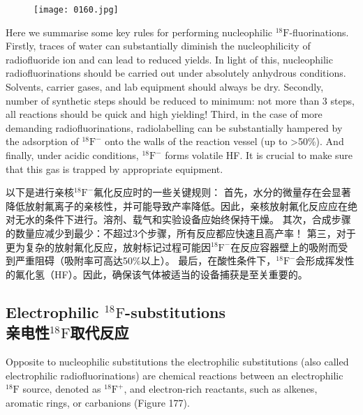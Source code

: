 \documentclass[dvipsnames, svgnames,a4paper,11pt]{article}
\begin{document}
\begin{figure}[h]
	\centering
    \texttt{[image: 0160.jpg]}    
     \label{fig176}
\end{figure}

Here we summarise some key rules for performing nucleophilic ${}^\mathrm{18}\mathrm{F}$-fluorinations.
Firstly, traces of water can substantially diminish the nucleophilicity of radiofluoride
ion and can lead to reduced yields. In light of this, nucleophilic radiofluorinations
should be carried out under absolutely anhydrous conditions. Solvents, carrier gases,
and lab equipment should always be dry. Secondly, number of synthetic steps
should be reduced to minimum: not more than 3 steps, all reactions should be quick
and high yielding! Third, in the case of more demanding radiofluorinations,
radiolabelling can be substantially hampered by the adsorption of ${}^\mathrm{18}\mathrm{F}^−$ onto the walls
of the reaction vessel (up to >50\%). And finally, under acidic conditions, ${}^\mathrm{18}\mathrm{F}^−$ forms
volatile HF. It is crucial to make sure that this gas is trapped by appropriate
equipment.

以下是进行亲核${}^\mathrm{18}\mathrm{F}^−$氟化反应时的一些关键规则： 首先，水分的微量存在会显著降低放射氟离子的亲核性，并可能导致产率降低。因此，亲核放射氟化反应应在绝对无水的条件下进行。溶剂、载气和实验设备应始终保持干燥。 其次，合成步骤的数量应减少到最少：不超过3个步骤，所有反应都应快速且高产率！ 第三，对于更为复杂的放射氟化反应，放射标记过程可能因${}^\mathrm{18}\mathrm{F}^−$在反应容器壁上的吸附而受到严重阻碍（吸附率可高达50\%以上）。 最后，在酸性条件下，${}^\mathrm{18}\mathrm{F}^−$会形成挥发性的氟化氢（HF）。因此，确保该气体被适当的设备捕获是至关重要的。

\subsection{Electrophilic ${}^\mathrm{18}\mathrm{F}$-substitutions \\亲电性${}^\mathrm{18}\mathrm{F}$取代反应}

Opposite to nucleophilic substitutions the electrophilic substitutions (also called
electrophilic radiofluorinations) are chemical reactions between an electrophilic ${}^\mathrm{18}\mathrm{F}$
source, denoted as {${}^\mathrm{18}\mathrm{F}^+$}, and electron-rich reactants, such as alkenes, aromatic
rings, or carbanions (Figure 177).
\end{document}
